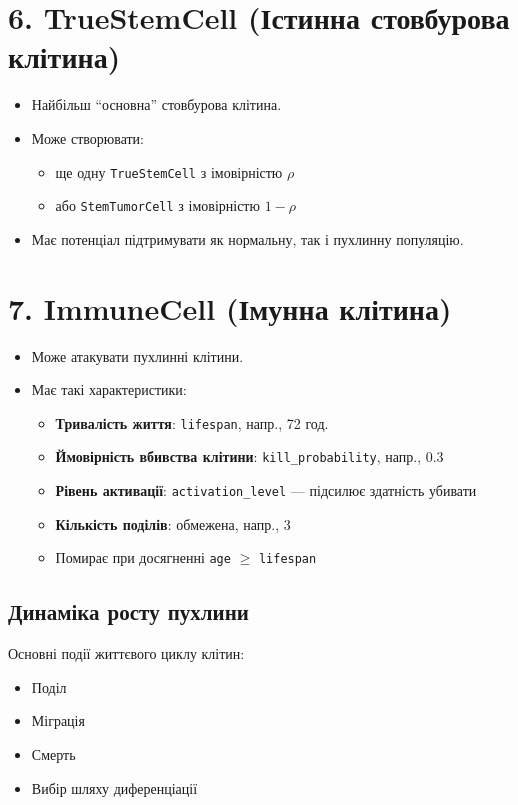 \documentclass{article}
\begin{document}
\section*{6. \textbf{TrueStemCell (Істинна стовбурова клітина)}}
\begin{itemize}
    \item Найбільш ``основна'' стовбурова клітина.
    \item Може створювати:
    \begin{itemize}
        \item ще одну \texttt{TrueStemCell} з імовірністю $\rho$
        \item або \texttt{StemTumorCell} з імовірністю $1 - \rho$
    \end{itemize}
    \item Має потенціал підтримувати як нормальну, так і пухлинну популяцію.
\end{itemize}

\section*{7. \textbf{ImmuneCell (Імунна клітина)}}
\begin{itemize}
    \item Може атакувати пухлинні клітини.
    \item Має такі характеристики:
    \begin{itemize}
        \item \textbf{Тривалість життя}: \texttt{lifespan}, напр., 72 год.
        \item \textbf{Ймовірність вбивства клітини}: \texttt{kill\_probability}, напр., 0.3
        \item \textbf{Рівень активації}: \texttt{activation\_level} — підсилює здатність убивати
        \item \textbf{Кількість поділів}: обмежена, напр., 3
        \item Помирає при досягненні \texttt{age} $\geq$ \texttt{lifespan}
    \end{itemize}
\end{itemize}

\subsection{Динаміка росту пухлини}
Основні події життєвого циклу клітин:
\begin{itemize}
    \item Поділ
    \item Міграція
    \item Смерть
    \item Вибір шляху диференціації
\end{itemize}
\end{document}
